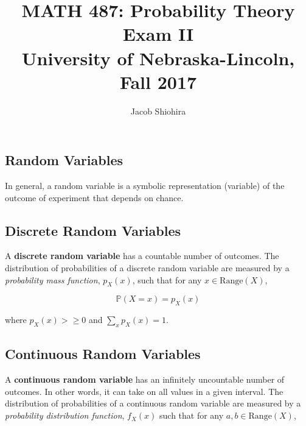 \documentclass[12pt]{article}
\newcommand{\prob}[1]{\mathbb{P}(#1)}
\begin{document}
\title{%
  MATH 487: Probability Theory Exam II\\
  \large University of Nebraska-Lincoln, Fall 2017}
\author{Jacob Shiohira}
\maketitle

\newpage

\begin{center}
\section*{Random Variables}
\end{center}

\noindent
In general, a random variable is a symbolic representation (variable) of the outcome of experiment that depends on chance.

\vspace*{.5cm}
\subsection*{Discrete Random Variables}
\noindent
A \textbf{discrete random variable} has a countable number of outcomes. The distribution of probabilities of a discrete random variable are measured by a \textit{probability mass function}, $p_X(x)$, such that for any $x \in \text{Range}(X)$, 

\begin{equation*}
\prob{X = x} = p_X(x)
\end{equation*}

\noindent
where $p_X(x) > \geq 0$ and $\sum_{x} p_X(x) = 1$.

\subsection*{Continuous Random Variables}
\noindent
A \textbf{continuous random variable} has an infinitely uncountable number of outcomes. In other words, it can take on all values in a given interval. The distribution of probabilities of a continuous random variable are measured by a \textit{probability distribution function}, $f_X(x)$ such that for any $a,b \in \text{Range}(X)$,
\end{document}
